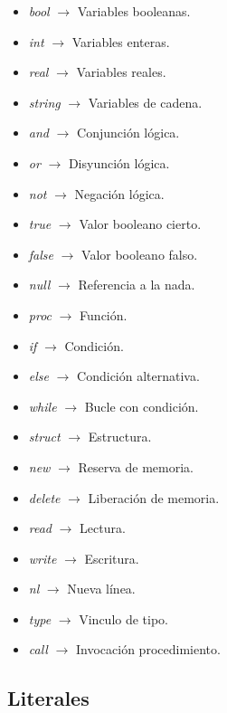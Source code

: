 \begin{itemize}
    \item \textit{bool} $\rightarrow$ Variables booleanas.
    \item \textit{int} $\rightarrow$ Variables enteras.
    \item \textit{real} $\rightarrow$ Variables reales.
    \item \textit{string} $\rightarrow$ Variables de cadena.
    \item \textit{and} $\rightarrow$ Conjunción lógica.
    \item \textit{or} $\rightarrow$ Disyunción lógica.
    \item \textit{not} $\rightarrow$ Negación lógica.
    \item \textit{true} $\rightarrow$ Valor booleano cierto.
    \item \textit{false} $\rightarrow$ Valor booleano falso.
    \item \textit{null} $\rightarrow$ Referencia a la nada.
    \item \textit{proc} $\rightarrow$ Función.
    \item \textit{if} $\rightarrow$ Condición.
    \item \textit{else} $\rightarrow$ Condición alternativa.
    \item \textit{while} $\rightarrow$ Bucle con condición.
    \item \textit{struct} $\rightarrow$ Estructura.
    \item \textit{new} $\rightarrow$ Reserva de memoria.
    \item \textit{delete} $\rightarrow$ Liberación de memoria.
    \item \textit{read} $\rightarrow$ Lectura.
    \item \textit{write} $\rightarrow$ Escritura.
    \item \textit{nl} $\rightarrow$ Nueva línea.
    \item \textit{type} $\rightarrow$ Vinculo de tipo.
    \item \textit{call} $\rightarrow$ Invocación procedimiento.
\end{itemize}

\subsection{Literales}

